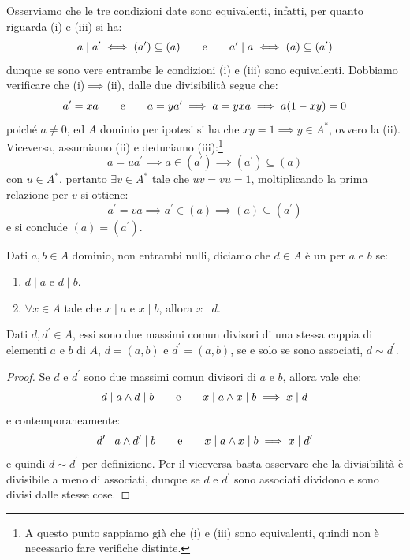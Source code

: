 \documentclass[11pt]{scrartcl}
\begin{document}
\begin{remark}
    Osserviamo che le tre condizioni date sono equivalenti, infatti, per quanto riguarda (i) e (iii) si ha:
    \[ a \mid a^{\prime} \iff (a^{\prime}) \subseteq (a) \qquad \text e \qquad a^{\prime}\mid a \iff (a) \subseteq (a^{\prime})
        \]
    dunque se sono vere entrambe le condizioni (i) e (iii) sono equivalenti. Dobbiamo verificare che (i)$\implies$(ii), dalle due divisibilità segue che:
    \[ a^{\prime} = xa \qquad \text e \qquad a = y a^{\prime} \implies a = yxa \implies a(1-xy) = 0
        \]
    poiché $a \ne 0$, ed $A$ dominio per ipotesi si ha che $xy = 1 \implies y \in A^*$, ovvero la (ii). Viceversa, assumiamo (ii) e deduciamo 
    (iii):\footnote{A questo punto sappiamo già che (i) e (iii) sono equivalenti, quindi non è necessario fare verifiche distinte.}
    \[ a = ua^{\prime} \implies a \in (a^{\prime}) \implies (a^{\prime}) \subseteq (a)
        \]
    con $u \in A^*$, pertanto $\exists v \in A^*$ tale che $uv = vu = 1$, moltiplicando la prima relazione per $v$ si ottiene:
    \[ a^{\prime} = va \implies a^{\prime} \in (a) \implies (a) \subseteq (a^{\prime})
        \]
    e si conclude $(a) = (a^{\prime})$.
\end{remark}

\begin{definition}
    Dati $a,b \in A$ dominio, non entrambi nulli, diciamo che $d \in A$ è un  per $a$ e $b$ se:
    \begin{enumerate}[(1)]
        \item $d \mid a$ e $d \mid b$.
        \item $\forall x \in A$ tale che $x \mid a$ e $x\mid b$, allora $x \mid d$.
    \end{enumerate}
\end{definition}

\begin{proposition}
    Dati $d,d^{\prime} \in A$, essi sono due massimi comun divisori di una stessa coppia di elementi $a$ e $b$ di $A$, $d=(a,b)$ e $d^{\prime} = (a,b)$, se e solo se sono associati, $d \sim d^{\prime}$.
\end{proposition}

\begin{proof}
Se $d$ e $d^{\prime}$ sono due massimi comun divisori di $a$ e $b$, allora vale che:
        \[ d \mid a \land d \mid b
        \qquad
        \text e
        \qquad
        x \mid a \land x \mid b \implies x \mid d
            \]
    e contemporaneamente:
        \[ d^{\prime} \mid a \land d^{\prime} \mid b
        \qquad
        \text e
        \qquad
        x \mid a \land x \mid b \implies x \mid d^{\prime}
            \]
    e quindi $d \sim d^{\prime}$ per definizione. Per il viceversa basta osservare che la divisibilità è divisibile a meno di associati, dunque se $d$ e $d^{\prime}$ sono associati dividono e sono divisi dalle stesse cose.
\end{proof}
\end{document}
